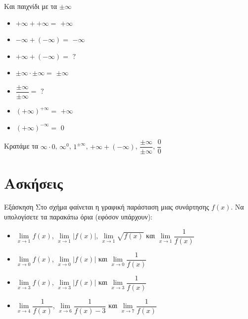 \documentclass{presentation}
\begin{document}
\begin{frame}{Και παιχνίδι με τα $\pm\infty$}
  \begin{multicols}{2}
    \begin{itemize}
      \item $+\infty + +\infty=$ \pause $+\infty$ \pause
      \item $-\infty + (-\infty)=$ \pause $-\infty$ \pause
      \item $+\infty + (-\infty)=$ \pause $?$ \pause
      \item $\pm\infty \cdot \pm\infty=$ \pause $\pm\infty$ \pause
      \item $\dfrac{\pm\infty}{\pm\infty}=$ \pause $?$ \pause
      \item $(+\infty)^{+\infty}=$ \pause $+\infty$ \pause
      \item $(+\infty)^{-\infty}=$ \pause $0$ \pause
    \end{itemize}
  \end{multicols}
  Κρατάμε τα $\infty\cdot 0$, $\infty^0$, $1^{\pm\infty}$, $+\infty + (-\infty)$, $\dfrac{\pm\infty}{\pm\infty}$, $\dfrac{0}{0}$
\end{frame}

\section{Ασκήσεις}
\begin{frame}{Εξάσκηση}
  Στο σχήμα
  \href{https://www.geogebra.org/m/xzc6usbm}{}
  φαίνεται η γραφική παράσταση μιας συνάρτησης $f(x)$. Να υπολογίσετε τα παρακάτω όρια (εφόσον υπάρχουν):
  \begin{itemize}
    \item $\lim\limits_{x \to 1}{ f(x) }$, $\lim\limits_{x \to 1}{ |f(x)| }$, $\lim\limits_{x \to 1}{ \sqrt{f(x)} }$ και $\lim\limits_{x \to 1}{ \dfrac{1}{f(x)} }$ \pause
    \item $\lim\limits_{x \to 0}{ f(x) }$, $\lim\limits_{x \to 0}{ |f(x)| }$ και $\lim\limits_{x \to 0}{ \dfrac{1}{f(x)} }$ \pause
    \item $\lim\limits_{x \to 3}{ f(x) }$, $\lim\limits_{x \to 3}{ |f(x)| }$ και $\lim\limits_{x \to 3}{ \dfrac{1}{f(x)} }$ \pause
    \item $\lim\limits_{x \to 4}{ \dfrac{1}{f(x)} }$, $\lim\limits_{x \to 6}{ \dfrac{1}{f(x)-3} }$ και $\lim\limits_{x \to 7}{ \dfrac{1}{f(x)} }$
  \end{itemize}
\end{frame}
\end{document}
